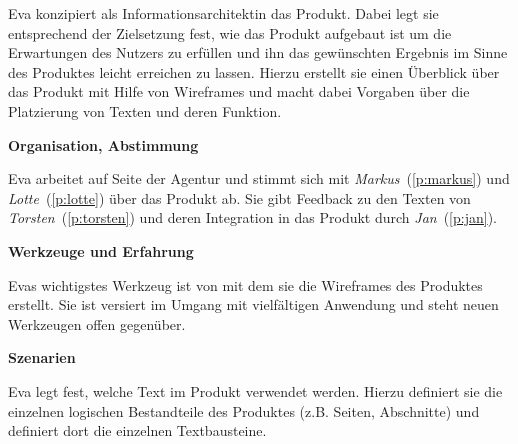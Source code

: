 \begin{multicols}{2}

\begin{center}
\end{center}


Eva konzipiert als Informationsarchitektin das Produkt. Dabei legt sie entsprechend der Zielsetzung fest, wie das Produkt aufgebaut ist um die Erwartungen des Nutzers zu erfüllen und ihn das gewünschten Ergebnis im Sinne des Produktes leicht erreichen zu lassen. Hierzu erstellt sie einen Überblick über das Produkt mit Hilfe von Wireframes und macht dabei Vorgaben über die Platzierung von Texten und deren Funktion.

\textbf{Organisation, Abstimmung}

Eva arbeitet auf Seite der Agentur und stimmt sich mit \emph{Markus}~(\ref{p:markus}) und \emph{Lotte}~(\ref{p:lotte}) über das Produkt ab. Sie gibt Feedback zu den Texten von \emph{Torsten}~(\ref{p:torsten}) und deren Integration in das Produkt durch \emph{Jan}~(\ref{p:jan}).

\textbf{Werkzeuge und Erfahrung}

Evas wichtigstes Werkzeug ist  von  mit dem sie die Wireframes des Produktes erstellt. Sie ist versiert im Umgang mit vielfältigen Anwendung und steht neuen Werkzeugen offen gegenüber.

\columnbreak

\textbf{Szenarien}

Eva legt fest, welche Text im Produkt verwendet werden. Hierzu definiert sie die einzelnen logischen Bestandteile des Produktes (z.B. Seiten, Abschnitte) und definiert dort die einzelnen Textbausteine.


\end{multicols}
